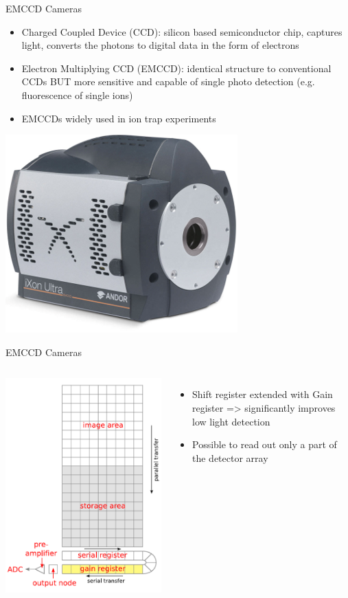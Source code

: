 \documentclass{beamer}
\begin{document}
\begin{frame}{EMCCD Cameras}

\begin{itemize}
\item Charged Coupled Device (CCD): silicon based semiconductor chip, captures light, converts the photons to digital data in the form of electrons
\bigskip
\item Electron Multiplying CCD (EMCCD):  identical structure to conventional CCDs BUT more sensitive and capable of single photo detection (e.g. fluorescence of single ions)
\bigskip
\item EMCCDs widely used in ion trap experiments
\end{itemize}

\centering
\includegraphics[scale=0.38]{Figures/iXon-Ultra-897.png}

\end{frame}


\begin{frame}{EMCCD Cameras}

\begin{columns}
             \centering
             \includegraphics[width=4.3 cm]{Figures/EMCCD_Structure.PNG}
              \begin{itemize}
\item Shift register extended with Gain register => significantly improves low light detection
\bigskip
\item Possible to read out only a part of the detector array
\end{itemize}
         \end{columns} 


\end{frame}
\end{document}
